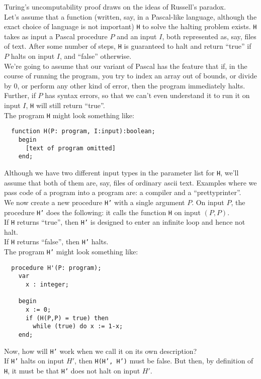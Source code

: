 \documentclass[12pt]{article}
\theoremstyle{plain}
\theoremstyle{definition}
\begin{document}
Turing's uncomputability proof draws on the ideas of Russell's paradox. \\
Let's assume that a function (written, say, in a Pascal-like language, although the exact choice of language is not important) \texttt{H} to solve the halting problem exists.
\texttt{H} takes as input a Pascal procedure $P$ and an input $I$, both represented as, say, files of text.
After some number of steps, \texttt{H} is guaranteed to halt and return ``true'' if $P$ halts on input $I$, and ``false'' otherwise. \\
We're going to assume that our variant of Pascal has the feature that if, in the course of running the program, you try to index an array out of bounds, or divide by 0, or perform any other kind of error, then the program immediately halts.
Further, if $P$ has syntax errors, so that we can't even understand it to run it on input $I$, \texttt{H} will still return ``true''. \\

The program \texttt{H} might look something like:
\begin{verbatim}
  function H(P: program, I:input):boolean;
    begin
      [text of program omitted]
    end;
\end{verbatim}

Although we have two different input types in the parameter list for \texttt{H}, we'll assume that both of them are, say, files of ordinary ascii text.
Examples where we pass code of a program into a program are: a compiler and a ``prettyprinter''. \\

We now create a new procedure \texttt{H'} with a single argument $P$.
On input $P$, the procedure \texttt{H'} does the following: it calls the function \texttt{H} on input $(P, P)$. \\
If \texttt{H} returns ``true'', then \texttt{H'} is designed to enter an infinite loop and hence not halt. \\
If \texttt{H} returns ``false'', then \texttt{H'} halts. \\

The program \texttt{H'} might look something like:
\begin{verbatim}
  procedure H'(P: program);
    var
      x : integer;

    begin
      x := 0;
      if (H(P,P) = true) then
        while (true) do x := 1-x;
    end;
\end{verbatim}

Now, how will \texttt{H'} work when we call it on its own description? \\
If \texttt{H'} halts on input $H'$, then \texttt{H(H', H')} must be false.
But then, by definition of \texttt{H}, it must be that \texttt{H'} does not halt on input $H'$. \\
\end{document}
